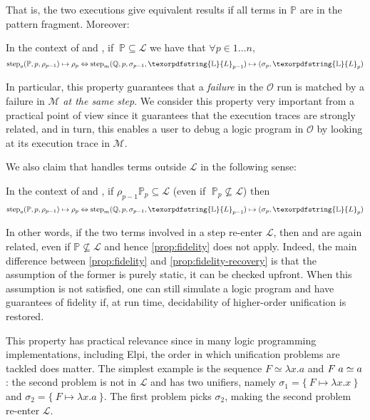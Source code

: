 \documentclass[sigconf,natbib=false,review]{acmart}
\newcommand{\appsep}{\ensuremath{\textcolor{lightgray}{\cdot}}}
\newcommand{\UnifRel}{\ensuremath{\simeq}}
\newcommand{\llambda}{\ensuremath{\mathcal{L}}\xspace}
\newcommand{\Fo}{\texorpdfstring{\ensuremath{\mathcal{O}}\xspace}{O}}
\newcommand{\Ho}{\texorpdfstring{\ensuremath{\mathcal{M}}\xspace}{M}}
\newcommand{\linkStore}{\texorpdfstring{\ensuremath{\mathbb{L}}\xspace}{L}}
\newcommand{\foUnifPb}{\ensuremath{\mathbb{P}}\xspace}
\newcommand{\hoUnifPb}{\ensuremath{\mathbb{Q}}\xspace}
\begin{document}
\noindent
That is, the two executions give equivalent results if all terms in
\foUnifPb are in the pattern fragment. Moreover:

\begin{proposition}\label{prop:fidelity}
In the context of  \frun and \hrun, if $~\foUnifPb \subseteq \llambda$ we have that
$\forall p \in 1 \ldots n,$
$$
\stepF{\foUnifPb}{p}{\rho_{p-1}}{\rho_p}
\Leftrightarrow
\stepH{\hoUnifPb}{p}{\sigma_{p-1}}{\linkStore_{p-1}}{\sigma_p}{\linkStore_p}
$$
\end{proposition}
\noindent
In particular, this property guarantees that a \emph{failure} in the \Fo{} run
is matched by a failure in \Ho{} \emph{at the same step}. We consider this
property very important from a practical point of view since it guarantees
that the execution traces are strongly related, and in turn, this enables a user
to debug a logic program in \Fo{} by looking at its execution trace in
\Ho{}.

We also claim that \hrun handles terms outside \llambda in the following sense:

\begin{proposition}\label{prop:fidelity-recovery} 
In the context of \frun and \hrun, if 
$\rho_{p-1} \foUnifPb_{p} \subseteq \llambda$ 
(even if $\;\foUnifPb_{p} \not\subseteq \llambda$)
then
$$
\stepF{\foUnifPb}{p}{\rho_{p-1}}{\rho_p} \Leftrightarrow
\stepH{\hoUnifPb}{p}{\sigma_{p-1}}{\linkStore_{p-1}}{\sigma_{p}}{\linkStore_p}
$$
\end{proposition}

\noindent
In other words, if the two terms involved in a step
re-enter \llambda, then \hstep and \fstep are again related, even if
$\foUnifPb \not\subseteq \llambda$ and hence \cref{prop:fidelity} does not apply.
Indeed, the main difference between \cref{prop:fidelity} and \cref{prop:fidelity-recovery}
is that the assumption of the former is purely static, it can be checked upfront. 
When this assumption is not satisfied, one can still simulate a logic program and
have guarantees of fidelity if, at run time, decidability of higher-order
unification is restored.

This property has practical relevance since in many logic programming
implementations, including Elpi, the order in which unification problems
are tackled does matter.
The simplest example is the sequence $F \UnifRel \lambda x.a$ and
$F \appsep a \UnifRel a$: the second problem is not in \llambda and has two
unifiers, namely $\sigma_1 = \{~ F \mapsto \lambda x.x ~\}$ and
$\sigma_2 = \{~ F \mapsto \lambda x.a ~\}$. The first problem picks $\sigma_2$,
making the second problem re-enter \llambda.
\end{document}
